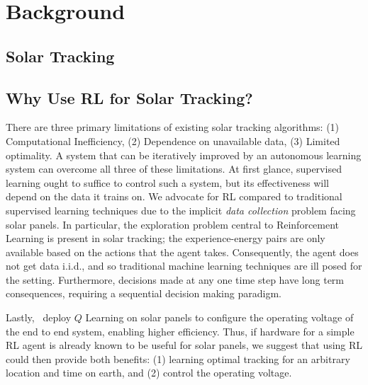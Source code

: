 \documentclass[11pt]{article}
\begin{document}
\section{Background}

\subsection{Solar Tracking}



\subsection{Why Use RL for Solar Tracking?}

There are three primary limitations of existing solar tracking algorithms: (1) Computational Inefficiency, (2) Dependence on unavailable data, (3) Limited optimality. A system that can be iteratively improved by an autonomous learning system can overcome all three of these limitations. At first glance, supervised learning ought to suffice to control such a system, but its effectiveness will depend on the data it trains on. We advocate for RL compared to traditional supervised learning techniques due to the implicit {\it data collection} problem facing solar panels. In particular, the exploration problem central to Reinforcement Learning is present in solar tracking; the experience-energy pairs are only available based on the actions that the agent takes. Consequently, the agent does not get data i.i.d., and so traditional machine learning techniques are ill posed for the setting. Furthermore, decisions made at any one time step have long term consequences, requiring a sequential decision making paradigm.

Lastly,~\citet{Hsu2015} deploy $Q$ Learning on solar panels to configure the operating voltage of the end to end system, enabling higher efficiency. Thus, if hardware for a simple RL agent is already known to be useful for solar panels, we suggest that using RL could then provide both benefits: (1) learning optimal tracking for an arbitrary location and time on earth, and (2) control the operating voltage. \\
\end{document}

